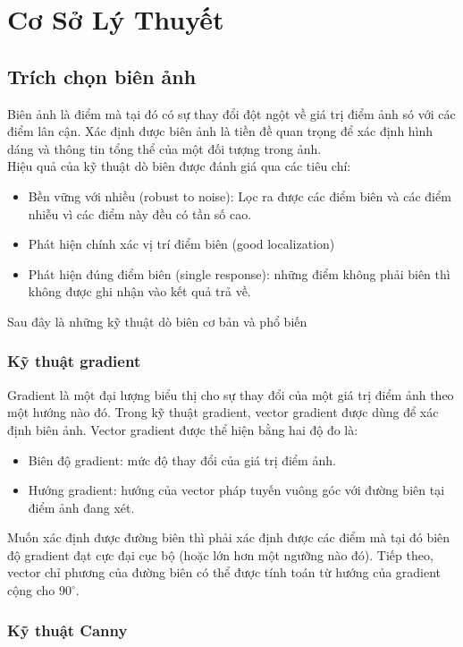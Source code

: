 \newpage
\section{Cơ Sở Lý Thuyết}
\subsection{Trích chọn biên ảnh}
Biên ảnh là điểm mà tại đó có sự thay đổi đột ngột về giá trị điểm ảnh só với các điểm lân cận. Xác định được biên ảnh là tiền đề quan trọng để xác định hình dáng và thông tin tổng thể của một đối tượng trong ảnh.\\

Hiệu quả của kỹ thuật dò biên được đánh giá qua các tiêu chí:
\begin{itemize}
	\item Bền vững với nhiều (robust to noise): Lọc ra được các điểm biên và các điểm nhiễu vì các điểm này đều có tần số cao.
	\item Phát hiện chính xác vị trí điểm biên (good localization)
	\item Phát hiện đúng điểm biên (single response): những điểm không phải biên thì không được ghi nhận vào kết quả trả về.
\end{itemize}
 
Sau đây là những kỹ thuật dò biên cơ bản và phổ biến
\subsubsection{Kỹ thuật gradient}
Gradient là một đại lượng biểu thị cho sự thay đổi của một giá trị điểm ảnh theo một hướng nào đó. Trong kỹ thuật gradient, vector gradient được dùng để xác định biên ảnh. Vector gradient được thể hiện bằng hai độ đo là:
\begin{itemize}
	\item Biên độ gradient: mức độ thay đổi của giá trị điểm ảnh.
	\item Hướng gradient: hướng của vector pháp tuyến vuông góc với đường biên tại điểm ảnh đang xét.
\end{itemize}
Muốn xác định được đường biên thì phải xác định được các điểm mà tại đó biên độ gradient đạt cực đại cục bộ (hoặc lớn hơn một ngưỡng nào đó). Tiếp theo, vector chỉ phương của đường biên có thể được tính toán từ hướng của gradient cộng cho $ 90^\circ $.

\subsubsection{Kỹ thuật Canny}

